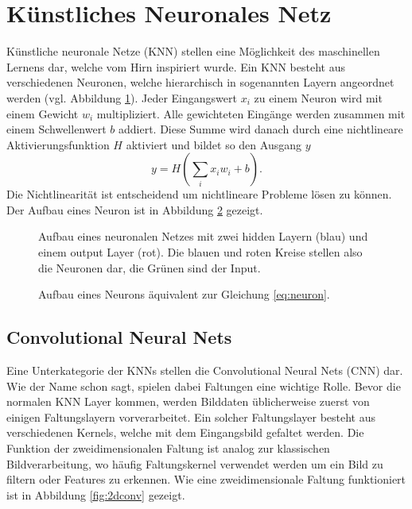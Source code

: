 \section{Künstliches Neuronales Netz}

Künstliche neuronale Netze (KNN) stellen eine Möglichkeit des maschinellen Lernens dar, welche vom Hirn inspiriert wurde.
Ein KNN besteht aus verschiedenen Neuronen, welche hierarchisch in sogenannten Layern angeordnet werden (vgl. Abbildung \ref{fig:neuralnet}).
Jeder Eingangswert $x_i$ zu einem Neuron wird mit einem Gewicht $w_i$ multipliziert.
Alle gewichteten Eingänge werden zusammen mit einem Schwellenwert $b$ addiert.
Diese Summe wird danach durch eine nichtlineare Aktivierungsfunktion $H$ aktiviert und bildet so den Ausgang $y$
\begin{equation} \label{eq:neuron}
y=H\left(\sum_{i} x_i w_i+b\right).
\end{equation}
Die Nichtlinearität ist entscheidend um nichtlineare Probleme lösen zu können.
Der Aufbau eines Neuron ist in Abbildung \ref{fig:neuron} gezeigt. 

\begin{figure}
	\centering
	
	\caption{Aufbau eines neuronalen Netzes mit zwei hidden Layern (blau) und einem output Layer (rot). Die blauen und roten Kreise stellen also die Neuronen dar, die Grünen sind der Input.}
	\label{fig:neuralnet}
\end{figure}

\begin{figure}
	\centering
	
	\caption{Aufbau eines Neurons äquivalent zur Gleichung \ref{eq:neuron}.}
	\label{fig:neuron}
\end{figure}

\subsection{Convolutional Neural Nets}

Eine Unterkategorie der KNNs stellen die Convolutional Neural Nets (CNN) dar.
Wie der Name schon sagt, spielen dabei Faltungen eine wichtige Rolle.
Bevor die normalen KNN Layer kommen, werden Bilddaten üblicherweise zuerst von einigen Faltungslayern vorverarbeitet.
Ein solcher Faltungslayer besteht aus verschiedenen Kernels, welche mit dem Eingangsbild gefaltet werden.
Die Funktion der zweidimensionalen Faltung ist analog zur klassischen Bildverarbeitung, wo häufig Faltungskernel verwendet werden um ein Bild zu filtern oder Features zu erkennen.
Wie eine zweidimensionale Faltung funktioniert ist in Abbildung \ref{fig:2dconv} gezeigt.

